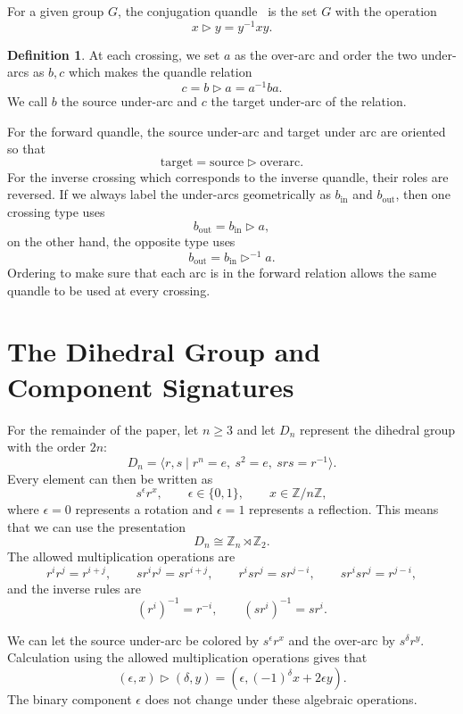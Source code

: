 \documentclass[11pt]{article}
\theoremstyle{definition}
\newtheorem{definition}[theorem]{Definition}
\newcommand{\Z}{\mathbb{Z}}
\begin{document}
For a given group $G$, the conjugation quandle~\cite[p.~105]{kamada2002} is the set $G$ with the operation
\[
x\triangleright y=y^{-1}xy.
\]

\begin{definition}
At each crossing, we set $a$ as the over-arc and order the two under-arcs as $b,c$ which makes the quandle relation~\cite[pp.~103--105]{kamada2002}
\[
c=b\triangleright a=a^{-1}ba.
\]
We call $b$ the source under-arc and $c$ the target under-arc of the relation.
\end{definition}

For the forward quandle, the source under-arc and target under arc are oriented so that
\[
\text{target}=\text{source}\triangleright\text{overarc}.
\]
For the inverse crossing which corresponds to the inverse quandle, their roles are reversed. If we always label the under-arcs geometrically as $b_{\mathrm{in}}$ and $b_{\mathrm{out}}$, then one crossing type uses
\[
b_{\mathrm{out}}=b_{\mathrm{in}}\triangleright a,
\]
on the other hand, the opposite type uses
\[
b_{\mathrm{out}}=b_{\mathrm{in}}\triangleright^{-1}a.
\]
Ordering to make sure that each arc is in the forward relation allows the same quandle to be used at every crossing.

\section{The Dihedral Group and Component Signatures}
\label{sec:dihedral-group}

For the remainder of the paper, let $n\geq3$ and let $D_n$ represent the dihedral group with the order $2n$:
\[
D_n=\langle r,s\mid r^n=e,\ s^2=e,\ srs=r^{-1}\rangle.
\]
Every element can then be written as
\[
s^\epsilon r^x,
\qquad
\epsilon\in\{0,1\},
\qquad
x\in\Z/n\Z,
\]
where $\epsilon=0$ represents a rotation and $\epsilon=1$ represents a reflection. This means that we can use the presentation~\cite[Sections~1.2 and~2.3.2]{Daugulis2017}
\[
D_n\cong\Z_n\rtimes\Z_2.
\]
The allowed multiplication operations are
\[
r^ir^j=r^{i+j},
\qquad
sr^ir^j=sr^{i+j},
\qquad
r^isr^j=sr^{j-i},
\qquad
sr^isr^j=r^{j-i},
\]
and the inverse rules are
\[
(r^i)^{-1}=r^{-i},
\qquad
(sr^i)^{-1}=sr^i.
\]

We can let the source under-arc be colored by $s^\epsilon r^x$ and the over-arc by $s^\delta r^y$. Calculation using the allowed multiplication operations gives that~\cite[Lemma~2.1]{IIMS2025}
\begin{equation}
(\epsilon,x)\triangleright(\delta,y)
=
\left(\epsilon,(-1)^\delta x+2\epsilon y\right).
\label{eq:dihedral-action}
\end{equation}
The binary component $\epsilon$ does not change under these algebraic operations.
\end{document}
